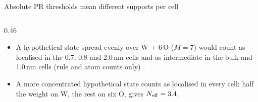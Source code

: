 \begin{frame}{Absolute PR thresholds mean different supports per cell}
\begin{columns}[T,onlytextwidth]
\begin{column}{0.46\textwidth}
\begin{itemize}
        \item A hypothetical state spread evenly over W + 6\,O ($M = 7$) would count as localised in the 0.7, 0.8
          and 2.0\,nm cells and as intermediate in the bulk and 1.0\,nm cells (rule and atom counts only)
          .
        \item A more concentrated hypothetical state counts as localised in every cell: half the weight on W, the
          rest on six O, gives $N_{\mathrm{eff}} = 3.4$.
      \end{itemize}
    \end{column}
  \end{columns}
\end{frame}

